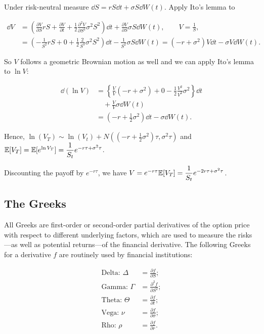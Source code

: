 \begin{solution}
Under risk-neutral measure $\dd S=rS\dd t+\sigma S\dd W(t)$. Apply Ito's lemma to

\[
\begin{aligned}
\dd V&=\left(\frac{\partial V}{\partial S}rS+\frac{\partial V}{\partial t}
+\frac{1}{2}\frac{\partial^2V}{\partial S^2}\sigma^2S^2\right)\dd t
+\frac{\partial V}{\partial S}\sigma S\dd W(t),\qquad V=\frac{1}{S},\\
&=\left(-\frac{1}{S^2}rS+0+\frac{1}{2}\frac{2}{S^3}\sigma^2S^2\right)\dd t
-\frac{1}{S^2}\sigma S\dd W(t)=(-r+\sigma^2)V\dd t-\sigma V\dd W(t).
\end{aligned}
\]

So $V$ follows a geometric Brownian motion as well and we can apply Ito's lemma to
$\ln V$:

\[
\begin{aligned}
\dd(\ln V)&=\left\{\frac{V}{V}(-r+\sigma^2)+0
-\frac{1}{2}\frac{V^2}{V^2}\sigma^2\right\}\dd t\\
&\quad+\frac{V}{V}\sigma\dd W(t)\\
&=\left(-r+\frac{1}{2}\sigma^2\right)\dd t-\sigma\dd W(t).
\end{aligned}
\]

Hence, $\ln(V_T)\sim\ln(V_t)+N\left((-r+\tfrac{1}{2}\sigma^2)\tau,\sigma^2\tau\right)$
and $\mathbb{E}[V_T]=\mathbb{E}[e^{\ln V_T}]=\dfrac{1}{S_t}e^{-r\tau+\sigma^2\tau}$.

Discounting the payoff by $e^{-r\tau}$, we have
$V=e^{-r\tau}\mathbb{E}[V_T]=\dfrac{1}{S_t}e^{-2r\tau+\sigma^2\tau}$.

\end{solution}

\subsection{The Greeks}

All Greeks are first-order or second-order partial derivatives of the option price with
respect to different underlying factors, which are used to measure the risks---as well as
potential returns---of the financial derivative. The following Greeks for a derivative $f$ are
routinely used by financial institutions:

\[
\begin{aligned}
\text{Delta: }\Delta&=\frac{\partial f}{\partial S};\\
\text{Gamma: }\Gamma&=\frac{\partial^2f}{\partial S^2};\\
\text{Theta: }\Theta&=\frac{\partial f}{\partial t};\\
\text{Vega: }\nu&=\frac{\partial f}{\partial\sigma};\\
\text{Rho: }\rho&=\frac{\partial f}{\partial r}.
\end{aligned}
\]

